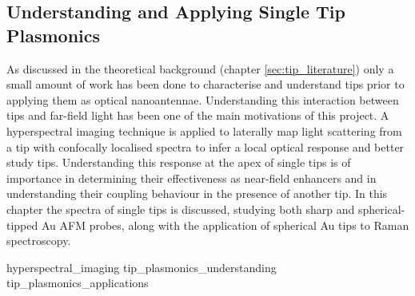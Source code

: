 \documentclass[12pt, a4paper, oneside]{book}
\begin{document}
\begin{singlespace}
\color{white}
\chapter{Understanding and Applying Single Tip Plasmonics}
\label{ch:tip_plasmonics}
\end{singlespace}


As discussed in the theoretical background (chapter \ref{sec:tip_literature}) only a small amount of work has been done to characterise and understand tips prior to applying them as optical nanoantennae. Understanding this interaction between tips and far-field light has been one of the main motivations of this project. A hyperspectral imaging technique is applied to laterally map light scattering from a tip with confocally localised spectra to infer a local optical response and better study tips. Understanding this response at the apex of single tips is of importance in determining their effectiveness as near-field enhancers and in understanding their coupling behaviour in the presence of another tip. In this chapter the spectra of single tips is discussed, studying both sharp and spherical-tipped Au AFM probes, along with the application of spherical Au tips to Raman spectroscopy.

{hyperspectral_imaging}
{tip_plasmonics_understanding}
{tip_plasmonics_applications}
\end{document}
